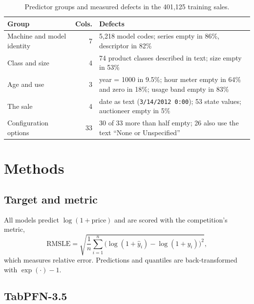 \documentclass[11pt,a4paper]{article}
\begin{document}
\begin{table}[H]
\centering\small
\caption{Predictor groups and measured defects in the 401,125 training sales.}
\label{tab:dirt}
\begin{tabular}{p{4.0cm}rp{9.0cm}}
\toprule
Group & Cols. & Defects \\
\midrule
Machine and model identity & 7 & 5,218 model codes; series empty in 86\%, descriptor in 82\% \\
Class and size & 4 & 74 product classes described in text; size empty in 53\% \\
Age and use & 3 & year = 1000 in 9.5\%; hour meter empty in 64\% and zero in 18\%; usage band empty in 83\% \\
The sale & 4 & date as text (\texttt{3/14/2012 0:00}); 53 state values; auctioneer empty in 5\% \\
Configuration options & 33 & 30 of 33 more than half empty; 26 also use the text ``None or Unspecified'' \\
\bottomrule
\end{tabular}
\end{table}

\section{Methods}

\subsection{Target and metric}

All models predict $\log(1+\text{price})$ and are scored with the competition's metric,
\begin{equation}
\mathrm{RMSLE} = \sqrt{\frac{1}{n}\sum_{i=1}^{n}\bigl(\log(1+\hat{y}_i) - \log(1+y_i)\bigr)^2},
\end{equation}
which measures relative error. Predictions and quantiles are back-transformed with $\exp(\cdot)-1$.

\subsection{TabPFN-3.5}
\end{document}
